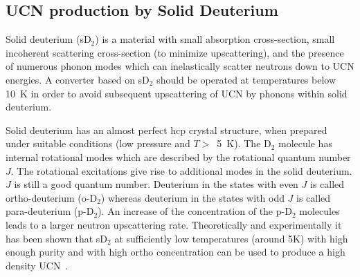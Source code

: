 


\subsection{UCN production by Solid Deuterium}
Solid deuterium (sD$_2$) is a material with small absorption
cross-section, small incoherent scattering cross-section (to minimize
upscattering), and the presence of numerous phonon modes which can
inelastically scatter neutrons down to UCN energies.
A converter based on sD$_2$ should be operated at temperatures below
10~K in order to avoid subsequent upscattering of UCN by phonons
within solid deuterium.
 
Solid deuterium has an almost perfect hcp crystal structure, when
prepared under suitable conditions (low pressure and $T >$~5~K). The
D$_2$ molecule has internal rotational modes which are described by
the rotational quantum number $J$. The rotational excitations give
rise to additional modes in the solid deuterium. %
$J$ is still a good quantum number.  Deuterium in the states with even
$J$ is called ortho-deuterium (o-D$_2$) whereas deuterium in the
states with odd $J$ is called para-deuterium (p-D$_2$). An increase of
the concentration of the p-D$_2$ molecules leads to a larger neutron
upscattering rate.
Theoretically and experimentally it has been shown that sD$_2$ at
sufficiently low temperatures (around 5K) with high enough purity and
with high ortho concentration can be used to produce a high density
UCN~\cite{Atchison2005}.

